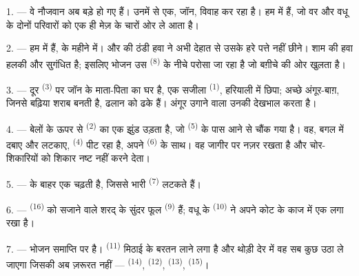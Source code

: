 
\VUsaut{4.0mm}
\VUsaut{1.6mm}
\VUsaut{3.2mm}

\VUsaut{1.6mm}
\VUsaut{2.6mm}

\VUsaut{3.0mm}

1. --- वे नौजवान अब बड़े हो गए हैं। उनमें से एक, जॉन, विवाह कर रहा है। हम
 में हैं, जो वर और वधू के दोनों परिवारों को एक ही मेज़ के
चारों ओर ले आता है।

2. --- हम  में हैं,  के महीने में।
 और  की ठंडी हवा ने अभी देहात से उसके हरे पत्ते
नहीं छीने। शाम की हवा हलकी और सुगंधित है; इसलिए भोजन उस 
\textsuperscript{(8)} के नीचे परोसा जा रहा है जो बग़ीचे की ओर खुलता है।

3. --- दूर  \textsuperscript{(3)} पर जॉन के माता-पिता का घर है, एक
सजीला  \textsuperscript{(1)}, हरियाली में छिपा; अच्छे
अंगूर-बाग़, जिनसे बढ़िया शराब बनती है, ढलान को ढके हैं। अंगूर उगाने वाला उनकी
देखभाल करता है।

4. --- बेलों के ऊपर से  \textsuperscript{(2)} का एक झुंड उड़ता है,
जो  \textsuperscript{(5)} के पास आने से चौंक गया है। वह,
बगल में  दबाए और  लटकाए,  \textsuperscript{(4)} पीट रहा है, अपने 
\textsuperscript{(6)} के साथ। वह जागीर पर नज़र रखता है और चोर-शिकारियों को शिकार नष्ट नहीं करने
देता।

5. ---  के बाहर एक  चढ़ती है, जिससे भारी
 \textsuperscript{(7)} लटकते हैं।

6. ---  \textsuperscript{(16)} को सजाने वाले शरद् के सुंदर फूल
 \textsuperscript{(9)} हैं; वधू के 
\textsuperscript{(10)} ने अपने कोट के काज में एक लगा रखा है।

7. --- भोजन समाप्ति पर है।  \textsuperscript{(11)} मिठाई के बरतन
लाने लगा है और थोड़ी देर में वह सब कुछ उठा ले जाएगा जिसकी अब ज़रूरत नहीं —
 \textsuperscript{(14)},  \textsuperscript{(12)},
 \textsuperscript{(13)}, 
\textsuperscript{(15)}।

